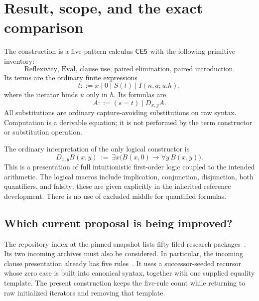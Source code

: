 \section{Result, scope, and the exact comparison}
\label{sec:overview}

The construction is a five-pattern calculus $\mathsf{CE5}$ with the following
primitive inventory:
\[
\boxed{\text{Reflexivity, Eval, clause use, paired elimination, paired introduction.}}
\]
Its terms are the ordinary finite expressions
\[
 t ::= x\mid 0\mid S(t)\mid I(n,a;u.h),
\]
where the iterator binds $u$ only in $h$. Its formulas are
\[
 A ::= (s=t)\mid D_{x,y}A.
\]
All substitutions are ordinary capture-avoiding substitutions on raw
syntax. Computation is a derivable equation; it is not performed by the
term constructor or substitution operation.

The ordinary interpretation of the only logical constructor is
\[
 D_{x,y}B(x,y)\ :=\
 \exists x\bigl(B(x,0)\to\forall y\,B(x,y)\bigr).
\]
This is a presentation of full intuitionistic first-order logic coupled
to the intended arithmetic. The logical macros include implication,
conjunction, disjunction, both quantifiers, and falsity; these are given
explicitly in the inherited reference development. There is no use of
excluded middle for quantified formulas.

\subsection{Which current proposal is being improved?}

The repository index at the pinned snapshot lists fifty filed research
packages~\cite{baseline}. Its two incoming archives must also be considered.
In particular, the incoming clause presentation already has five
rules~\cite{clausal}. It uses a successor-seeded recursor whose zero case
is built into canonical syntax, together with one supplied equality
template. The present construction keeps the five-rule count while
returning to raw initialized iterators and removing that template.

